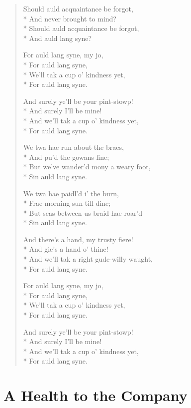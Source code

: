 \documentclass[9pt,twoside]{extarticle}
\newenvironment{xverse}{
	\begin{verse}
	\fontsize{8.5}{10.5}\selectfont
}{
	\end{verse}
}
\begin{document}
\begin{xverse}
Should auld acquaintance be forgot, \\*
And never brought to mind? \\*
Should auld acquaintance be forgot, \\*
And auld lang syne?

For auld lang syne, my jo, \\*
For auld lang syne, \\*
We’ll tak a cup o’ kindness yet, \\*
For auld lang syne.

And surely ye’ll be your pint-stowp! \\*
And surely I’ll be mine! \\*
And we’ll tak a cup o’ kindness yet, \\*
For auld lang syne.

We twa hae run about the braes, \\*
And pu’d the gowans fine; \\*
But we’ve wander’d mony a weary foot, \\*
Sin auld lang syne.

We twa hae paidl’d i’ the burn, \\*
Frae morning sun till dine; \\*
But seas between us braid hae roar’d \\*
Sin auld lang syne.

And there’s a hand, my trusty fiere! \\*
And gie’s a hand o’ thine! \\*
And we’ll tak a right gude-willy waught, \\*
For auld lang syne.

For auld lang syne, my jo, \\*
For auld lang syne, \\*
We’ll tak a cup o’ kindness yet, \\*
For auld lang syne.

And surely ye’ll be your pint-stowp! \\*
And surely I’ll be mine! \\*
And we’ll tak a cup o’ kindness yet, \\*
For auld lang syne.
\end{xverse}

\section{A Health to the Company}
\end{document}
